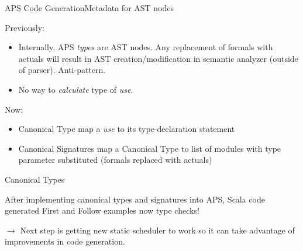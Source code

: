 \begin{frame}[fragile=singleslide]{APS Code Generation}{Metadata for AST nodes}

Previously:

\begin{itemize}
    \item Internally, APS \emph{types} are AST nodes. Any replacement of formals with actuals will result in AST creation/modification in semantic analyzer (outside of parser). \alert{Anti-pattern}.
    \item No way to \emph{calculate} type of \emph{use}.
\end{itemize}

Now:

\begin{itemize}
    \item \alert{Canonical Type} map a \emph{use} to its type-declaration statement
    \item \alert{Canonical Signatures} map a \alert{Canonical Type} to list of modules with type parameter \alert{substituted} (formals replaced with actuals)
\end{itemize}

\end{frame}


\begin{frame}{Canonical Types}{}
    
After implementing canonical types and signatures into APS, Scala code generated First and Follow examples \alert{now type checks}!

\newlinevspace

$\to$ Next step is getting new \alert{static scheduler} to work so it can take advantage of improvements in code generation.

\end{frame}